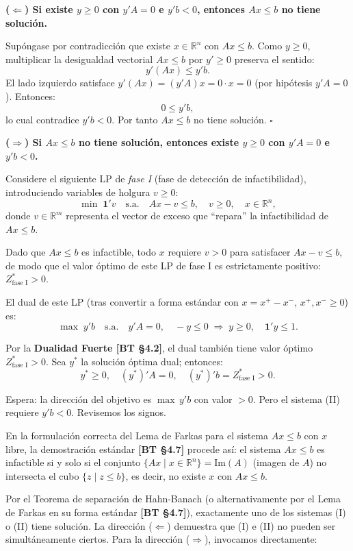 \documentclass{article}
\begin{document}
\textbf{($\Leftarrow$) Si existe $y \geq 0$ con $y'A = 0$ e $y'b < 0$, entonces $Ax \leq b$ no tiene solución.}

Supóngase por contradicción que existe $x \in \mathbb{R}^n$ con $Ax \leq b$. Como $y \geq 0$, multiplicar la desigualdad vectorial $Ax \leq b$ por $y' \geq 0$ preserva el sentido:
\[
  y'(Ax) \leq y'b.
\]
El lado izquierdo satisface $y'(Ax) = (y'A)x = 0 \cdot x = 0$ (por hipótesis $y'A = 0$). Entonces:
\[
  0 \leq y'b,
\]
lo cual contradice $y'b < 0$. Por tanto $Ax \leq b$ no tiene solución. $\square$

\medskip
\textbf{($\Rightarrow$) Si $Ax \leq b$ no tiene solución, entonces existe $y \geq 0$ con $y'A = 0$ e $y'b < 0$.}

Considere el siguiente LP de \emph{fase I} (fase de detección de infactibilidad), introduciendo variables de holgura $v \geq 0$:
\[
  \min\; \mathbf{1}'v \quad \text{s.a.}\quad Ax - v \leq b,\quad v \geq 0,\quad x \in \mathbb{R}^n,
\]
donde $v \in \mathbb{R}^m$ representa el vector de exceso que ``repara'' la infactibilidad de $Ax \leq b$.

Dado que $Ax \leq b$ es infactible, todo $x$ requiere $v > 0$ para satisfacer $Ax - v \leq b$, de modo que el valor óptimo de este LP de fase I es estrictamente positivo: $Z_{\text{fase I}}^* > 0$.

El dual de este LP (tras convertir a forma estándar con $x = x^+ - x^-$, $x^+, x^- \geq 0$) es:
\[
  \max\; y'b \quad \text{s.a.}\quad y'A = 0,\quad -y \leq 0 \;\Rightarrow\; y \geq 0,\quad \mathbf{1}'y \leq 1.
\]

Por la \textbf{Dualidad Fuerte [BT §4.2]}, el dual también tiene valor óptimo $Z_{\text{fase I}}^* > 0$. Sea $y^*$ la solución óptima dual; entonces:
\[
  y^* \geq 0, \quad (y^*)'A = 0, \quad (y^*)'b = Z_{\text{fase I}}^* > 0.
\]

Espera: la dirección del objetivo es $\max\, y'b$ con valor $> 0$. Pero el sistema (II) requiere $y'b < 0$. Revisemos los signos.

En la formulación correcta del Lema de Farkas para el sistema $Ax \leq b$ con $x$ libre, la demostración estándar \textbf{[BT §4.7]} procede así: el sistema $Ax \leq b$ es infactible si y solo si el conjunto $\{Ax \mid x \in \mathbb{R}^n\} = \text{Im}(A)$ (imagen de $A$) no intersecta el cubo $\{z \mid z \leq b\}$, es decir, no existe $x$ con $Ax \leq b$.

Por el Teorema de separación de Hahn-Banach (o alternativamente por el Lema de Farkas en su forma estándar \textbf{[BT §4.7]}), exactamente uno de los sistemas (I) o (II) tiene solución. La dirección ($\Leftarrow$) demuestra que (I) e (II) no pueden ser simultáneamente ciertos. Para la dirección ($\Rightarrow$), invocamos directamente:
\end{document}
